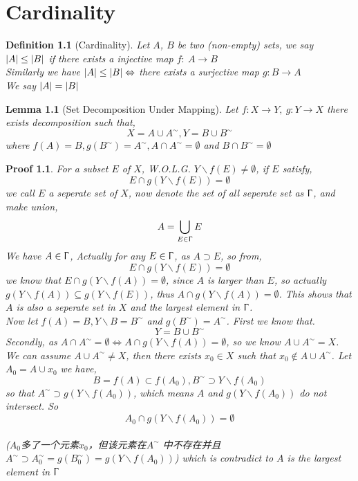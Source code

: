 \chapter{Cardinality}
\newtheorem*{myDef}{Definition}
\newtheorem*{myTheo}{Theorem}
\newtheorem*{myPf}{Proof}
\newtheorem*{myLemma}{Lemma}
\newtheorem*{myProp}{Proposal}
\begin{myDef}[Cardinality]
Let $A$, $B$ be two (non-empty) sets, we say  $\lvert A\rvert\leq\lvert B\rvert$ if there exists a injective map $f:\ A\rightarrow B$
\\
Similarly we have $\lvert A\rvert\leq \lvert B\rvert \Leftrightarrow$ there exists a surjective map $g: B\rightarrow A$
\\
We say $\lvert A\rvert = \lvert B\rvert $
\end{myDef}


\begin{myLemma}[Set Decomposition Under Mapping]
	Let $f: X\rightarrow Y,\ g: Y\rightarrow X$ there exists decomposition such that,
	\[X = A\cup A^{\sim}, Y=B\cup B^{\sim}\]
	where $f(A)=B, g(B^\sim)=A^\sim, A\cap A^\sim=\emptyset$ and $B\cap B^\sim=\emptyset$
\end{myLemma}
\begin{myPf}
	For a subset $E$ of $X$, W.O.L.G. $Y\backslash f(E)\neq\emptyset$, if $E$ satisfy,
	\[E\cap g(Y\backslash f(E))=\emptyset\]
	we call $E$ a seperate set of $X$, now denote the set of all seperate set as $\Upgamma$, and make union,
	\[A=\bigcup_{E\in \Upgamma}E\]
	We have $A\in \Upgamma$, Actually for any $E\in \Upgamma$, as $A\supset E$, so from,
	\[E\cap g(Y\backslash f(E))=\emptyset\]
	we know that $E\cap g(Y\backslash f(A))=\emptyset$, since $A$ is larger than $E$, so actually $g(Y\backslash f(A))\subseteq g(Y\backslash f(E))$, thus $A\cap g(Y\backslash f(A))=\emptyset$. This shows that $A$ is also a seperate set in $X$ and the largest element in $\Upgamma$.
	\\
	Now let $f(A)=B, Y\backslash B=B^\sim$ and $g(B^\sim)=A^\sim$. First we know that.
	\[Y=B\cup B^\sim\]
	Secondly, as $A\cap A^\sim=\emptyset\Leftrightarrow A\cap g(Y\backslash f(A))=\emptyset$, so we know $A\cup A^\sim=X$.
	\\
	We can assume $A\cup A^\sim \neq X$, then there exists $x_0\in X$ such that $x_0\notin A\cup A^\sim$. Let $A_0=A\cup {x_0}$ we have,
	\[B=f(A)\subset f(A_0), B^\sim \supset Y\backslash f(A_0)\]
	so that $A^\sim \supset g(Y\backslash f(A_0))$, which means $A$ and $g(Y\backslash f(A_0))$ do not intersect. So
	\[A_0\cap g(Y\backslash f(A_0))=\emptyset\]
	\\($A_0$多了一个元素$x_0$，但该元素在$A^\sim$ 中不存在并且$A^\sim \supset A_0^\sim=g(B_0^\sim) = g(Y\backslash f(A_0))$)
	which is contradict to $A$ is the largest element in $\Upgamma$
\end{myPf}
